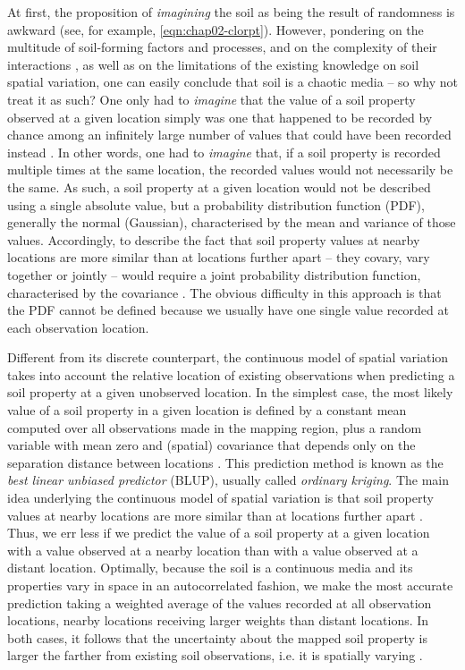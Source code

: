 At first, the proposition of \emph{imagining} the soil as being the result of randomness is awkward (see, for 
example, \autoref{eqn:chap02-clorpt}). However, pondering on the multitude of soil-forming factors and 
processes, and on the complexity of their interactions \cite{BockheimEtAl2010, GrunwaldEtAl2011}, as well as 
on the limitations of the existing knowledge on soil spatial variation, one can easily conclude that soil is a 
chaotic media \cite{Webster2000} -- so why not treat it as such? One only had to \emph{imagine} that the value 
of a soil property observed at a given location simply was one that happened to be recorded by chance among an 
infinitely large number of values that could have been recorded instead \cite{Webster2000}. In other words, 
one had to \emph{imagine} that, if a soil property is recorded multiple times at the same location, the 
recorded values would not necessarily be the same. As such, a soil property at a given location would not be 
described using a single absolute value, but a probability distribution function (PDF), generally the normal 
(Gaussian), characterised by the mean and variance of those  values. Accordingly, to describe the 
fact that soil property values at nearby locations are more similar than at locations further apart -- they 
covary, vary together or jointly -- would require a joint probability distribution function, characterised by 
the covariance \cite{WebsterEtAl1990, Cressie1993}. The obvious difficulty in this approach is that the PDF 
cannot be defined because we usually have one single value recorded at each observation location.

Different from its discrete counterpart, the continuous model of spatial variation takes into account the 
relative location of existing observations when predicting a soil property at a given unobserved location. In 
the simplest case, the most likely value of a soil property in a given location is defined by a constant mean 
computed over all observations made in the mapping region, plus a random variable with mean zero and (spatial) 
covariance that depends only on the separation distance between locations \cite{WebsterEtAl1990, Cressie1993}.
This prediction method is known as the \emph{best linear unbiased predictor} (BLUP), usually called 
\emph{ordinary kriging}. The main idea underlying the continuous model of spatial variation is that soil 
property values at nearby locations are more similar than at locations further apart \cite{WebsterEtAl1990}. 
Thus, we err less if we predict the value of a soil property at a given location with a value observed at a 
nearby location than with a value observed at a distant location. Optimally, because the soil is a continuous 
media and its properties vary in space in an autocorrelated fashion, we make the most accurate prediction 
taking a weighted average of the values recorded at all observation locations, nearby locations receiving 
larger weights than distant locations. In both cases, it follows that the uncertainty about the mapped soil 
property is larger the farther from existing soil observations, i.e. it is spatially varying 
\cite{Cressie1993}.

